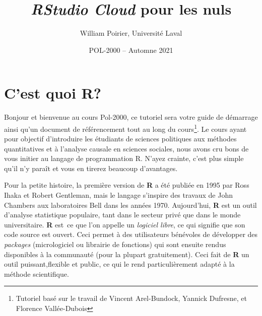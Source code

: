 \documentclass[10.5pt,a4paper]{article}
\title{\textbf{\emph{RStudio Cloud}} pour les nuls}
\author{William Poirier, Université Laval}
\date{POL-2000 -- Automne 2021}
\begin{document}
 

\restoregeometry %
\nopagecolor%

\tableofcontents

\pagebreak

\section{C'est quoi R?}
Bonjour et bienvenue au cours Pol-2000, ce tutoriel sera votre guide de démarrage ainsi qu'un document de référencement tout au long du cours\footnote{Tutoriel basé sur le travail de Vincent Arel-Bundock, Yannick Dufresne, et Florence Vallée-Dubois}. Le cours ayant pour objectif d'introduire les étudiants de sciences politiques aux méthodes quantitatives et à l'analyse causale en sciences sociales, nous avons cru bons de vous initier au langage de programmation R. N'ayez crainte, c'est plus simple qu'il n'y paraît et vous en tirerez beaucoup d'avantages. 

Pour la petite histoire, la première version de \textbf{R} a été publiée en 1995 par Ross Ihaka et Robert Gentleman, mais le langage s'inspire des travaux de John Chambers aux laboratoires Bell dans les années 1970. Aujourd'hui, \textbf{R} est un outil d'analyse statistique populaire, tant dans le secteur privé que dans le monde universitaire. \textbf{R} est\ ce que l'on appelle un \textit{logiciel libre}, ce qui signifie que son code source est ouvert. Ceci permet à des utilisateurs bénévoles de développer des \textit{packages} (micrologiciel ou librairie de fonctions) qui sont ensuite rendus disponibles à la communauté (pour la plupart gratuitement). Ceci fait de \textbf{R} un outil puissant,flexible et public, ce qui le rend particulièrement adapté à la méthode scientifique. 
\end{document}

